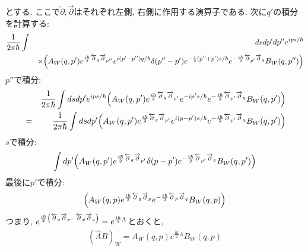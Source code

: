 \documentclass[10.5pt,a4paper]{jsarticle}
\begin{document}
とする. ここで$\overleftarrow{\partial}, \overrightarrow{\partial}$はそれぞれ左側, 右側に作用する演算子である. 次に$q'$の積分を計算する:
\begin{eqnarray}
  \nonumber\frac{1}{2\pi\hbar}\int&& ds dp' dp'' e^{ips/\hbar}\\
  &&\times\qty(A_W\qty(q, p')e^{\frac{i\hbar}{2}\overleftarrow{\partial}_q\overrightarrow{\partial}_{p''}}e^{i(p'-p'')q/\hbar}\delta(p''-p')e^{-\frac{i}{2}(p''+p')s/\hbar}e^{-\frac{i\hbar}{2}\overleftarrow{\partial}_{p'}\overrightarrow{\partial}_{q}}B_W\qty(q, p''))
\end{eqnarray}
$p''$で積分:
\begin{eqnarray}
  &&\frac{1}{2\pi\hbar}\int ds dp' e^{ips/\hbar}\qty(A_W\qty(q, p')e^{\frac{i\hbar}{2}\overleftarrow{\partial}_q\overrightarrow{\partial}_{p'}}e^{-ip's/\hbar}e^{-\frac{i\hbar}{2}\overleftarrow{\partial}_{p'}\overrightarrow{\partial}_{q}}B_W\qty(q, p'))\\
  &=& \frac{1}{2\pi\hbar}\int ds dp' \qty(A_W\qty(q, p')e^{\frac{i\hbar}{2}\overleftarrow{\partial}_q\overrightarrow{\partial}_{p'}}e^{i(p-p')s/\hbar}e^{-\frac{i\hbar}{2}\overleftarrow{\partial}_{p'}\overrightarrow{\partial}_{q}}B_W\qty(q, p'))
\end{eqnarray}
$s$で積分:
\begin{eqnarray}
  \int dp' \qty(A_W\qty(q, p')e^{\frac{i\hbar}{2}\overleftarrow{\partial}_q\overrightarrow{\partial}_{p'}}\delta(p-p')e^{-\frac{i\hbar}{2}\overleftarrow{\partial}_{p'}\overrightarrow{\partial}_{q}}B_W\qty(q, p'))
\end{eqnarray}
最後に$p'$で積分:
\begin{eqnarray}
  \qty(A_W\qty(q, p)e^{\frac{i\hbar}{2}\overleftarrow{\partial}_q\overrightarrow{\partial}_{p}}e^{-\frac{i\hbar}{2}\overleftarrow{\partial}_{p}\overrightarrow{\partial}_{q}}B_W\qty(q, p))
\end{eqnarray}
つまり, $e^{\frac{i\hbar}{2}\qty(\overleftarrow{\partial}_q\overrightarrow{\partial}_{p}-\overleftarrow{\partial}_{p}\overrightarrow{\partial}_{q})} = e^{\frac{i\hbar}{2}\Lambda}$とおくと,
\begin{eqnarray}
  (\hat{A}\hat{B})_W = A_W(q, p)e^{\frac{i\hbar}{2}\Lambda}B_W(q, p)\label{wigner_end}
\end{eqnarray}
\end{document}
